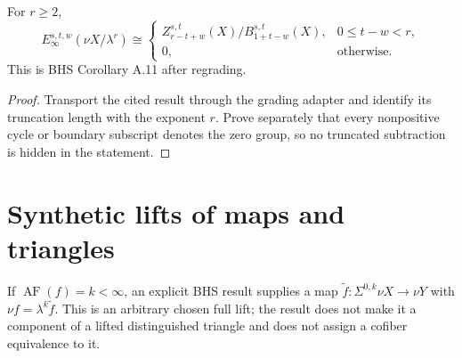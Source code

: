 \begin{theorem}
  \label{thm:external-synthetic-einfty-quotient}
  \notready
  For $r\ge2$,
  \[
    E_\infty^{s,t,w}(\nu X/\lambda^r)\cong
    \begin{cases}
      Z_{r-t+w}^{s,t}(X)/B_{1+t-w}^{s,t}(X),&0\le t-w<r,\\
      0,&\text{otherwise}.
    \end{cases}
  \]
  This is BHS Corollary A.11 after regrading.
\end{theorem}

\begin{proof}
  Transport the cited result through the grading adapter and identify its
  truncation length with the exponent $r$.  Prove separately that every
  nonpositive cycle or boundary subscript denotes the zero group, so no
  truncated subtraction is hidden in the statement.
\end{proof}







\section{Synthetic lifts of maps and triangles}

\begin{theorem}
  \label{thm:external-synthetic-lift}
  \notready
  If $\operatorname{AF}(f)=k<\infty$, an explicit BHS result supplies a map
  $\widetilde f:\Sigma^{0,k}\nu X\to\nu Y$ with
  $\nu f=\lambda^k\widetilde f$.  This is an arbitrary chosen full lift; the
  result does not make it a component of a lifted distinguished triangle and
  does not assign a cofiber equivalence to it.
\end{theorem}

